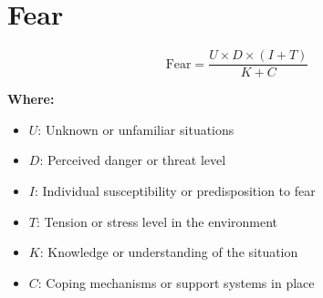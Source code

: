 \chapter{Fear}

\begin{equation}
\text{Fear} = \frac{U \times D \times (I + T)}{K + C}
\end{equation}

\textbf{Where:}

\begin{itemize}
    \item $U$: Unknown or unfamiliar situations
    \item $D$: Perceived danger or threat level
    \item $I$: Individual susceptibility or predisposition to fear
    \item $T$: Tension or stress level in the environment
    \item $K$: Knowledge or understanding of the situation
    \item $C$: Coping mechanisms or support systems in place
\end{itemize}